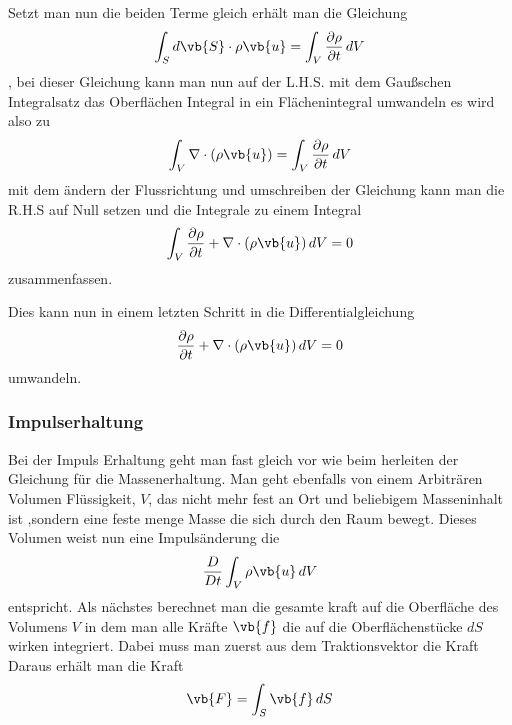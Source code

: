 Setzt man nun die beiden Terme gleich erhält man die Gleichung 
\[\int_{S}d\vb{S}\cdot\rho\vb{u} 
=
\int_{V}\frac{\partial \rho}{\partial t} \, dV\], 
bei dieser Gleichung kann man nun auf der L.H.S. mit dem Gaußschen Integralsatz das Oberflächen Integral in ein Flächenintegral umwandeln es wird also zu
\[\int_{V}\nabla\cdot(\rho\vb{u}) 
=
\int_{V}\frac{\partial \rho}{\partial t} \, dV \]
mit dem ändern der Flussrichtung und umschreiben der Gleichung kann man die R.H.S auf Null setzen und die Integrale zu einem Integral
\[\int_{V}\frac{\partial \rho}{\partial t} + \nabla\cdot(\rho\vb{u})  \, dV 
= 
0\]
zusammenfassen.

Dies kann nun in einem letzten Schritt in die Differentialgleichung
\[\frac{\partial \rho}{\partial t} + \nabla\cdot(\rho\vb{u})  \, dV 
= 
0\] 
umwandeln.

\subsubsection{Impulserhaltung}
Bei der Impuls Erhaltung geht man fast gleich vor wie beim herleiten der Gleichung für die Massenerhaltung.
Man geht ebenfalls von einem Arbiträren Volumen Flüssigkeit, $V$, das nicht mehr fest an Ort und beliebigem Masseninhalt ist ,sondern eine feste menge Masse die sich durch den Raum bewegt.
Dieses Volumen weist nun eine Impulsänderung die 
\[\frac{D}{Dt}\int_{V}\rho\vb{u}\, dV\]
entspricht.
Als nächstes berechnet man die gesamte kraft auf die Oberfläche des Volumens $V$ in dem man alle Kräfte $\vb{f}$ die auf die Oberflächenstücke $dS$ wirken integriert.
Dabei muss man zuerst aus dem Traktionsvektor die Kraft 
Daraus erhält man die Kraft 
\[\vb{F} 
=
\int_{S}\vb{f}\, dS\]
